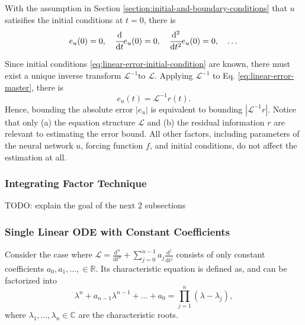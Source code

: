 \documentclass[accepted]{uai2023}
\newcommand{\dt}[1]{\cfrac{\mathrm{d} #1}{\mathrm{d} t}}
\newcommand{\dnt}[2]{\cfrac{\mathrm{d}^{#1} #2}{\mathrm{d} t^{#1}}}
\newcommand{\Err}{e}
\renewcommand{\L}{\mathcal{L}}
\begin{document}
    With the assumption in Section \ref{section:initial-and-boundary-conditions} that $u$ satisifies the initial conditions at $t=0$, there is
    {
        \small
        \begin{equation} \label{eq:linear-error-initial-condition}
            \Err_u(0) = 0, \quad \dt{}{}\Err_u(0) = 0, \quad \dnt{2}{}\Err_u(0) = 0, \quad \dots 
        \end{equation}
    }

    Since initial conditions \ref{eq:linear-error-initial-condition} are known, there must exist a unique inverse transform $\L^{-1}$to $\L$.  Applying $\L^{-1}$ to Eq. \ref{eq:linear-error-master}, there is 
    {
        \small
        \begin{equation}\label{eq:linear-error-inverse-master}
            \Err_u(t) = \L^{-1} r(t).
        \end{equation}
    }
    Hence, bounding the absolute error $\left|\Err_u\right|$ is equivalent to bounding $\left|\L^{-1} r\right|$. 
    Notice that only (a) the equation structure $\L$ and (b) the residual information $r$ are relevant to estimating the error bound. 
    All other factors, including parameters of the neural network $u$, forcing function $f$, and initial conditions, do not affect the estimation at all.

\subsubsection{Integrating Factor Technique}
    TODO: explain the goal of the next 2 subsections
\subsubsection{Single Linear ODE with Constant Coefficients}\label{section:single-linear-ode-with-constant-coefficients}
    Consider the case where $\L = \frac{\mathrm{d}^n}{\mathrm{d}t^n} + \sum_{j=0}^{n - 1} a_j \frac{\mathrm{d}^j}{\mathrm{d}t^j}$ consists of only constant coefficients $a_0, a_1, \dots, \in \mathbb{R}$.
    Its characteristic equation is defined as, and can be factorized into
    {
        \small
        \begin{equation} \label{eq:single-linear-ode-characteristic-polynomial-factorization}
            \lambda^n + a_{n-1}\lambda^{n-1} + \dots + a_0 = \prod_{j=1}^{n}(\lambda - \lambda_j),
        \end{equation}
    }
    where $\lambda_1, \dots, \lambda_n \in \mathbb{C}$ are the characteristic roots. 
\end{document}
